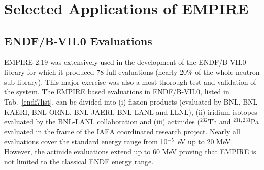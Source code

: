 \section{Selected Applications of EMPIRE}

\subsection{ENDF/B-VII.0 Evaluations}

EMPIRE-2.19 was extensively used in the development of the ENDF/B-VII.0
library for which it produced 78 full evaluations (nearly 20\% of the whole
neutron sub-library). This major exercise was also a most thorough test and
validation of the system. The EMPIRE based evaluations in ENDF/B-VII.0,
listed in Tab.~\ref{endf7list}, can be divided into (i) fission products
(evaluated by BNL, BNL-KAERI, BNL-ORNL, BNL-JAERI, BNL-LANL and LLNL), (ii)
iridium isotopes evaluated by the BNL-LANL collaboration and (iii) actinides
($^{232}$Th and $^{231,233}$Pa evaluated in the frame of the IAEA
coordinated research project. Nearly all evaluations cover the standard
energy range from 10$^{-5}$~eV up to 20 MeV. However, the actinide
evaluations extend up to 60 MeV proving that EMPIRE is not limited to the
classical ENDF energy range.

